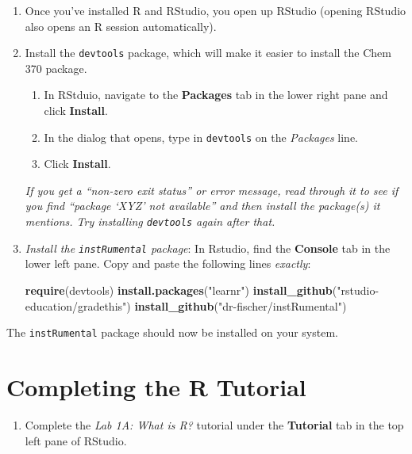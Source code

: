 \documentclass[]{tufte-book}
\newenvironment{Shaded}{}{}
\newcommand{\KeywordTok}[1]{\textcolor[rgb]{0.00,0.44,0.13}{\textbf{#1}}}
\newcommand{\NormalTok}[1]{#1}
\newcommand{\StringTok}[1]{\textcolor[rgb]{0.25,0.44,0.63}{#1}}
\providecommand{\tightlist}{%
  \setlength{\itemsep}{0pt}\setlength{\parskip}{0pt}}
\begin{document}
\begin{enumerate}
\def\labelenumi{\arabic{enumi}.}
\item
  Once you've installed R and RStudio, you open up RStudio (opening RStudio also opens an R session automatically).\\
\item
  Install the \texttt{devtools} package, which will make it easier to install the Chem 370 package.

  \begin{enumerate}
  \def\labelenumii{\arabic{enumii}.}
  \tightlist
  \item
    In RStduio, navigate to the \textbf{Packages} tab in the lower right pane and click \textbf{Install}.
  \item
    In the dialog that opens, type in \texttt{devtools} on the \emph{Packages} line.
  \item
    Click \textbf{Install}.
  \end{enumerate}

  \emph{If you get a ``non-zero exit status'' or error message, read through it to see if you find ``package `XYZ' not available'' and then install the package(s) it mentions. Try installing \texttt{devtools} again after that.}
\item
  \emph{Install the \texttt{instRumental} package}: In Rstudio, find the \textbf{Console} tab in the lower left pane. Copy and paste the following lines \emph{exactly}:

\begin{Shaded}
\begin{Highlighting}[]
\KeywordTok{require}\NormalTok{(devtools)}
\KeywordTok{install.packages}\NormalTok{(}\StringTok{"learnr"}\NormalTok{)}
\KeywordTok{install_github}\NormalTok{(}\StringTok{"rstudio-education/gradethis"}\NormalTok{)}
\KeywordTok{install_github}\NormalTok{(}\StringTok{"dr-fischer/instRumental"}\NormalTok{)}
\end{Highlighting}
\end{Shaded}
\end{enumerate}

The \texttt{instRumental} package should now be installed on your system.

\hypertarget{completing-the-r-tutorial}{%
\section{Completing the R Tutorial}\label{completing-the-r-tutorial}}

\begin{enumerate}
\def\labelenumi{\arabic{enumi}.}
\tightlist
\item
  Complete the \emph{Lab 1A: What is R?} tutorial under the \textbf{Tutorial} tab in the top left pane of RStudio.
\end{enumerate}
\end{document}
